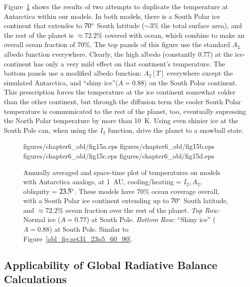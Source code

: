 Figure~\ref{obl_fig:set32_34_23p5} shows the results of two attempts
to duplicate the temperature at Antarctica within our models.  In both
models, there is a South Polar ice continent that extendes to
$70\mbox{$^\circ$}$ South latitude ($\sim 3\%$ the total surface area), and the
rest of the planet is $\approx 72.2\%$ covered with ocean, which
combine to make an overall ocean fraction of 70\%.  The top panels of
this figure use the standard $A_2$ albedo function everywhere.
Clearly, the high albedo (constantly 0.77) at the ice-continent has
only a very mild effect on that continent's temperature.  The bottom
panels use a modified albedo function: $A_2[T]$ everywhere except the
simulated Antarctica, and ``shiny ice''($A=0.88$) on the South Polar
continent.  This prescription forces the temperature at the ice
continent somewhat colder than the other continent, but
through the diffusion term the cooler South Polar temperature is
communicated to the rest of the planet, too, eventually supressing the
North Polar temperature by more than 10~K.  Using even shinier ice at
the South Pole can, when using the $I_2$ function, drive the planet to
a snowball state.


\begin{figure}[p]
\plottwo
{figures/chapter6_obl/fig15a.eps}
{figures/chapter6_obl/fig15b.eps}\\
\plottwo
{figures/chapter6_obl/fig15c.eps}
{figures/chapter6_obl/fig15d.eps}
\caption[Annually averaged and space-time plot of temperatures on
models with Antarctica analogs, at 1~AU, cooling/heating = $I_2,A_2$,
obliquity = $23.5\degr$.]{Annually averaged and space-time plot of
temperatures on models with Antarctica analogs, at 1~AU,
cooling/heating = $I_2,A_2$, obliquity = $23.5\degr$.  These models
have 70\% ocean coverage overall, with a South Polar ice continent
extending up to $70\mbox{$^\circ$}$ South latitude, and $\approx 72.2\%$ ocean
fraction over the rest of the planet. {\it Top Row:} Normal ice
($A=0.77$) at South Pole.  {\it Bottom Row:} ``Shiny ice'' ($A=0.88$)
at South Pole.
%
Similar to Figure~\ref{obl_fig:set31_23p5_60_90}.}
\label{obl_fig:set32_34_23p5}
\end{figure}

\afterpage{\clearpage}

\subsection{Applicability of Global Radiative Balance Calculations}
\label{obl_sssec:global_balance}

